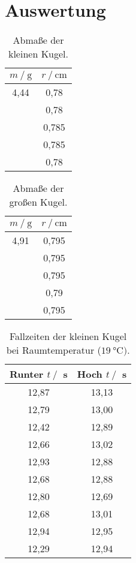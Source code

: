 \section{Auswertung}
\label{sec:Auswertung}

\begin{table}[H]
  \centering
      \caption{Abmaße der kleinen Kugel.}
      \label{tab:klKugel}
      \begin{tabular}{c c}
      \toprule
      $m \:/\: \si{\gram} $ & $r \:/\: \si{\cm}$\\
      \midrule
      4,44 & 0,78 \\ 
       & 0,78 \\
       & 0,785 \\
       & 0,785 \\
       & 0,78 \\
      \bottomrule
  \end{tabular}
\end{table}

\begin{table}[H]
  \centering
      \caption{Abmaße der großen Kugel.}
      \label{tab:grKugel}
      \begin{tabular}{c c}
      \toprule
      $m \:/\: \si{\gram} $ & $r \:/\: \si{\cm}$\\
      \midrule
      4,91 & 0,795 \\ 
       & 0,795 \\
       & 0,795 \\
       & 0,79 \\
       & 0,795 \\
      \bottomrule
  \end{tabular}
\end{table}

\begin{table}[H]
  \centering
      \caption{Fallzeiten der kleinen Kugel bei Raumtemperatur ($\SI{19}{\celsius})$.}
      \label{tab:klKugRaum}
      \begin{tabular}{c c}
      \toprule
      Runter $t\:/\:$ s & Hoch $t\:/\:$ s\\
      \midrule
        12,87 & 13,13 \\
        12,79 & 13,00 \\
        12,42 & 12,89 \\
        12,66 & 13,02 \\
        12,93 & 12,88 \\
        12,68 & 12,88 \\
        12,80 & 12,69 \\
        12,68 & 13,01 \\
        12,94 & 12,95 \\
        12,29 & 12,94 \\
      \bottomrule
  \end{tabular}
\end{table}

